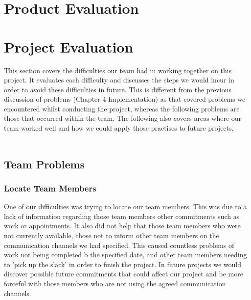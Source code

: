 \documentclass{l3proj}
\begin{document}
\section{Product Evaluation}

\section{Project Evaluation}
This section covers the difficulties our team had in working together on this project. It evaluates each difficulty and discusses the steps we would incur in order to avoid these difficulties in future. This is different from the previous discussion of problems (Chapter 4 Implementation) as that covered problems we encountered whilst conducting the project, whereas the following problems are those that occurred within the team. The following also covers areas where our team worked well and how we could apply those practises to future projects.  \\
\\
\subsection{Team Problems}

\subsubsection{Locate Team Members}
One of our difficulties was trying to locate our team members. This was due to a lack of information regarding those team members other commitments such as work or appointments. It also did not help that those team members who were not currently available, chose not to inform other team members on the communication channels we had specified. This caused countless problems of work not being completed b the specified date, and other team members needing to 'pick up the slack' in order to finish the project. In future projects we would discover possible future commitments that could affect our project and be more forceful with those members who are not using the agreed communication channels.\\
\\
\end{document}
